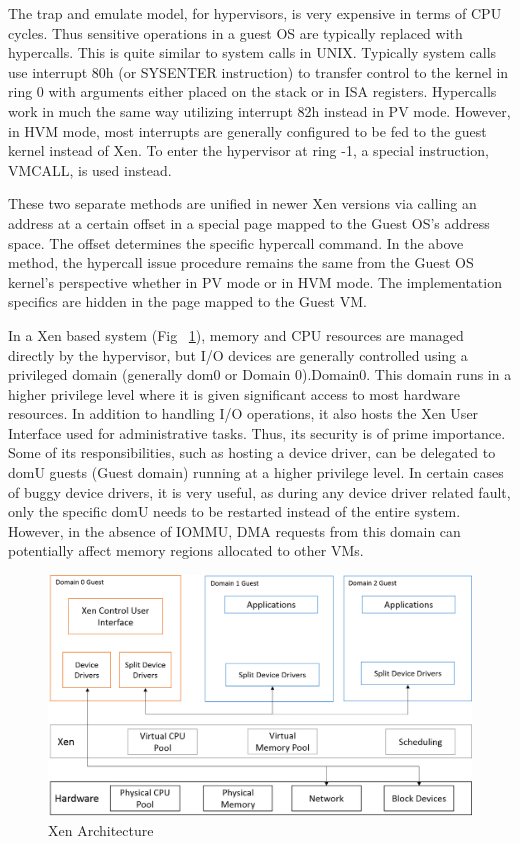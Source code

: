  

The trap and emulate model, for hypervisors, is very expensive in terms of CPU cycles. Thus sensitive operations in a guest OS are typically replaced with hypercalls. This is quite similar to system calls in UNIX. Typically system calls use interrupt 80h (or SYSENTER instruction) to transfer control to the kernel in ring 0 with arguments either placed on the stack or in ISA registers. Hypercalls work in much the same way utilizing interrupt 82h instead in PV mode. However, in HVM mode, most interrupts are generally configured to be fed to the guest kernel instead of Xen. To enter the hypervisor at ring -1, a special instruction, VMCALL, is used instead. 

 

These two separate methods are unified in newer Xen versions via calling an address at a certain offset in a special page mapped to the Guest OS's address space. The offset determines the specific hypercall command. In the above method, the hypercall issue procedure remains the same from the Guest OS kernel's perspective whether in PV mode or in HVM mode. The implementation specifics are hidden in the page mapped to the Guest VM. 

 
In a Xen based system (Fig ~\ref{fig:xen_model}), memory and CPU resources are managed directly by the hypervisor, but I/O devices are generally controlled using a privileged domain (generally dom0 or Domain 0).Domain0. This domain runs in a higher privilege level where it is given significant access to most hardware resources. In addition to handling I/O operations, it also hosts the Xen User Interface used for administrative tasks. Thus, its security is of prime importance. Some of its responsibilities, such as hosting a device driver, can be delegated to domU guests (Guest domain) running at a higher privilege level. In certain cases of buggy device drivers, it is very useful, as during any device driver related fault, only the specific domU needs to be restarted instead of the entire system. However, in the absence of IOMMU, DMA requests from this domain can potentially affect memory regions allocated to other VMs. 

\begin{figure}
\centering
\includegraphics[scale=0.6]{figures/Xen_model.png}
\caption{Xen Architecture}
\label{fig:xen_model}
\end{figure}

